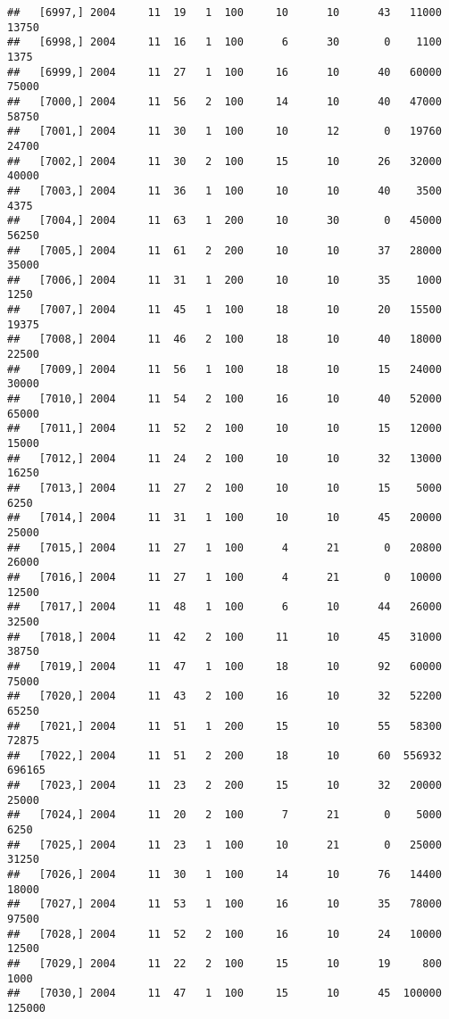 \documentclass{article}\usepackage[]{graphicx}\usepackage[]{color}
\makeatletter
\newenvironment{kframe}{%
 \def\at@end@of@kframe{}%
 \ifinner\ifhmode%
  \def\at@end@of@kframe{\end{minipage}}%
  \begin{minipage}{\columnwidth}%
 \fi\fi%
 \def\FrameCommand##1{\hskip\@totalleftmargin \hskip-\fboxsep
 \colorbox{shadecolor}{##1}\hskip-\fboxsep
     \hskip-\linewidth \hskip-\@totalleftmargin \hskip\columnwidth}%
 \MakeFramed {\advance\hsize-\width
   \@totalleftmargin\z@ \linewidth\hsize
   \@setminipage}}%
 {\par\unskip\endMakeFramed%
 \at@end@of@kframe}
\newenvironment{knitrout}{}{} %
\makeatother
\begin{document}
\begin{knitrout}
\begin{kframe}
\begin{verbatim}
##   [6997,] 2004     11  19   1  100     10      10      43   11000   13750
##   [6998,] 2004     11  16   1  100      6      30       0    1100    1375
##   [6999,] 2004     11  27   1  100     16      10      40   60000   75000
##   [7000,] 2004     11  56   2  100     14      10      40   47000   58750
##   [7001,] 2004     11  30   1  100     10      12       0   19760   24700
##   [7002,] 2004     11  30   2  100     15      10      26   32000   40000
##   [7003,] 2004     11  36   1  100     10      10      40    3500    4375
##   [7004,] 2004     11  63   1  200     10      30       0   45000   56250
##   [7005,] 2004     11  61   2  200     10      10      37   28000   35000
##   [7006,] 2004     11  31   1  200     10      10      35    1000    1250
##   [7007,] 2004     11  45   1  100     18      10      20   15500   19375
##   [7008,] 2004     11  46   2  100     18      10      40   18000   22500
##   [7009,] 2004     11  56   1  100     18      10      15   24000   30000
##   [7010,] 2004     11  54   2  100     16      10      40   52000   65000
##   [7011,] 2004     11  52   2  100     10      10      15   12000   15000
##   [7012,] 2004     11  24   2  100     10      10      32   13000   16250
##   [7013,] 2004     11  27   2  100     10      10      15    5000    6250
##   [7014,] 2004     11  31   1  100     10      10      45   20000   25000
##   [7015,] 2004     11  27   1  100      4      21       0   20800   26000
##   [7016,] 2004     11  27   1  100      4      21       0   10000   12500
##   [7017,] 2004     11  48   1  100      6      10      44   26000   32500
##   [7018,] 2004     11  42   2  100     11      10      45   31000   38750
##   [7019,] 2004     11  47   1  100     18      10      92   60000   75000
##   [7020,] 2004     11  43   2  100     16      10      32   52200   65250
##   [7021,] 2004     11  51   1  200     15      10      55   58300   72875
##   [7022,] 2004     11  51   2  200     18      10      60  556932  696165
##   [7023,] 2004     11  23   2  200     15      10      32   20000   25000
##   [7024,] 2004     11  20   2  100      7      21       0    5000    6250
##   [7025,] 2004     11  23   1  100     10      21       0   25000   31250
##   [7026,] 2004     11  30   1  100     14      10      76   14400   18000
##   [7027,] 2004     11  53   1  100     16      10      35   78000   97500
##   [7028,] 2004     11  52   2  100     16      10      24   10000   12500
##   [7029,] 2004     11  22   2  100     15      10      19     800    1000
##   [7030,] 2004     11  47   1  100     15      10      45  100000  125000

\end{verbatim}
\end{kframe}
\end{knitrout}
\end{document}
